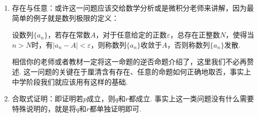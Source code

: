\begin{enumerate}

    \item 存在与任意：或许这一问题应该交给数学分析或是微积分老师来讲解，因为最简单的例子就是数列极限的定义：
    \begin{definition*}
        设数列$\{a_n\}$，若存在常数$A$，对于任意给定的正数$\varepsilon$，总存在正整数$N$，使得当$n>N$时，有$|a_n-A|<\varepsilon$，则称数列$\{a_n\}$收敛于$A$，否则称数列$\{a_n\}$发散.
    \end{definition*}

    相信你的老师或者教材一定将这一命题的逆否命题介绍了，这里我们不必再赘述. 这一问题的关键在于厘清含有存在、任意的命题如何正确地取否，事实上中学阶段我们就应该用有这样的基础.

    \item 合取式证明：即证明若$p$成立，则$q$和$r$都成立. 事实上这一类问题没有什么需要特殊说明的，就是将$q$和$r$都单独证明即可.


\end{enumerate}
